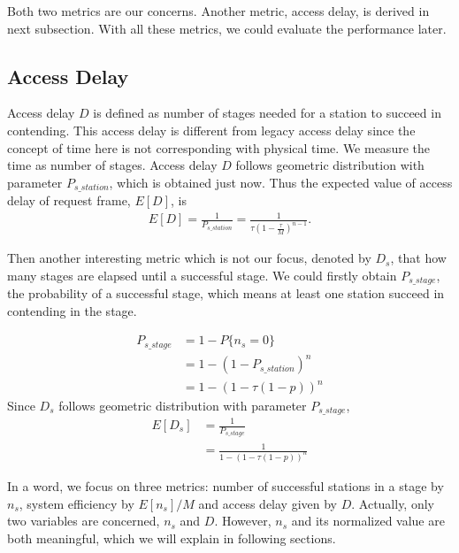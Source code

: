 Both two metrics are our concerns. Another metric, access delay, is derived in next subsection.
With all these metrics, we could evaluate the performance later.

	
\subsection{Access Delay}
Access delay $D$ is defined as number of stages needed for a station to succeed in contending.  
This access delay is different from legacy access delay since the concept of time here is not corresponding with physical time.
We measure the time as number of stages.
Access delay $D$ follows geometric distribution with parameter $P_{s\_station}$, which is obtained just now.
Thus the expected value of access delay of request frame, $E[D]$, is 
\begin{align}
\label{equ_delay}
E[D] = \frac{1}{P_{s\_{station}}} = \frac{1}{\tau (1-\frac{\tau}{M})^{n-1}}.
\end{align}

Then another interesting metric which is not our focus, denoted by $D_s$, that how many stages are elapsed until a successful stage. 
We could firstly obtain $P_{s\_stage}$, the probability of a successful stage, which means at least one station succeed in contending in the stage.

\begin{align}
P_{s\_stage} &= 1-P\lbrace n_s = 0\rbrace \nonumber \\
	&= 1-(1-P_{s\_station})^n \nonumber\\
	&= 1-(1-\tau(1-p))^n
\end{align} 	 
Since $D_s$ follows geometric distribution with parameter $P_{s\_stage}$,  
\begin{align}
E[D_s] &= \frac{1}{P_{s\_stage}}  \nonumber \\
			&= \frac{1}{1-(1-\tau(1-p))^n}
\end{align} 

In a word, we focus on three metrics: number of successful stations in a stage by $n_s$, system efficiency by $E[n_s]/M$ and access delay given by $D$. 
Actually, only two variables are concerned, $n_s$ and $D$. However, $n_s$ and its normalized value are both meaningful, which we will explain in following sections.


